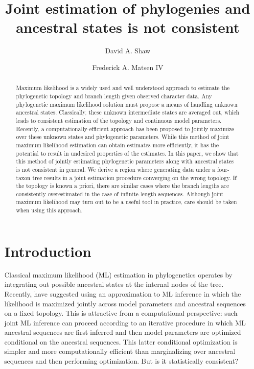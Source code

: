 \documentclass{article}
\title{Joint estimation of phylogenies and ancestral states is not consistent}
\author{David A. Shaw \and Frederick A. Matsen IV}
\begin{document}
\maketitle

\renewcommand{\arraystretch}{1.2} %

\begin{abstract}
Maximum likelihood is a widely used and well understood approach to estimate the phylogenetic topology and branch length given observed character data.
Any phylogenetic maximum likelihood solution must propose a means of handling unknown ancestral states.
Classically, these unknown intermediate states are averaged out, which leads to consistent estimation of the topology and continuous model parameters.
Recently, a computationally-efficient approach has been proposed to jointly maximize over these unknown states and phylogenetic parameters.
While this method of joint maximum likelihood estimation can obtain estimates more efficiently, it has the potential to result in undesired properties of the estimates.
In this paper, we show that this method of jointly estimating phylogenetic parameters along with ancestral states is not consistent in general.
We derive a region where generating data under a four-taxon tree results in a joint estimation procedure converging on the wrong topology.
If the topology is known a priori, there are similar cases where the branch lengths are consistently overestimated in the case of infinite-length sequences.
Although joint maximum likelihood may turn out to be a useful tool in practice, care should be taken when using this approach.
\end{abstract}

\section*{Introduction}

Classical maximum likelihood (ML) estimation in phylogenetics operates by integrating out possible ancestral states at the internal nodes of the tree.
Recently, \cite{Sagulenko2017-jo} have suggested using an approximation to ML inference in which the likelihood is maximized jointly across model parameters and ancestral sequences on a fixed topology.
This is attractive from a computational perspective: such joint ML inference can proceed according to an iterative procedure in which ML ancestral sequences are first inferred and then model parameters are optimized conditional on the ancestral sequences.
This latter conditional optimization is simpler and more computationally efficient than marginalizing over ancestral sequences and then performing optimization.
But is it statistically consistent?
\end{document}

